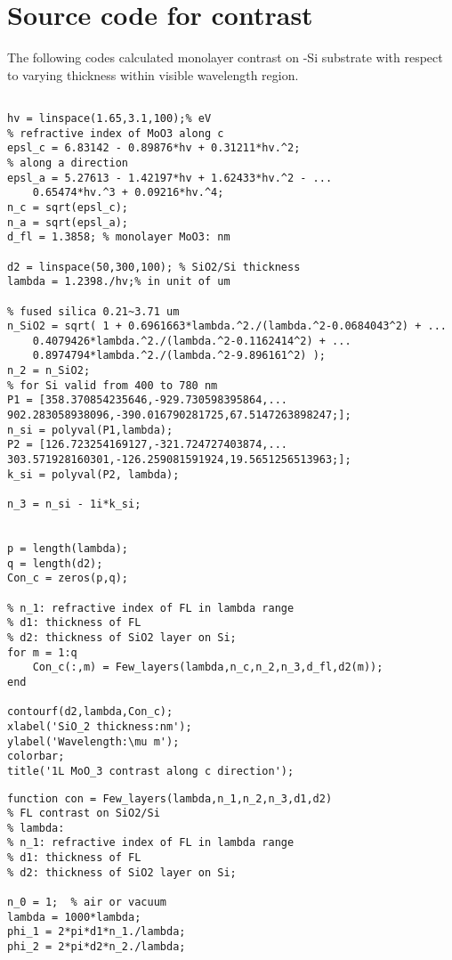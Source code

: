 
\chapter{Source code for contrast}

The following codes calculated monolayer  contrast on -Si substrate with respect to varying  thickness within visible wavelength region. 
\begin{singlespace}
\begin{lstlisting}

hv = linspace(1.65,3.1,100);% eV
% refractive index of MoO3 along c
epsl_c = 6.83142 - 0.89876*hv + 0.31211*hv.^2;
% along a direction
epsl_a = 5.27613 - 1.42197*hv + 1.62433*hv.^2 - ...
    0.65474*hv.^3 + 0.09216*hv.^4;
n_c = sqrt(epsl_c);
n_a = sqrt(epsl_a);
d_fl = 1.3858; % monolayer MoO3: nm

d2 = linspace(50,300,100); % SiO2/Si thickness
lambda = 1.2398./hv;% in unit of um

% fused silica 0.21~3.71 um
n_SiO2 = sqrt( 1 + 0.6961663*lambda.^2./(lambda.^2-0.0684043^2) + ...
    0.4079426*lambda.^2./(lambda.^2-0.1162414^2) + ...
    0.8974794*lambda.^2./(lambda.^2-9.896161^2) );
n_2 = n_SiO2;
% for Si valid from 400 to 780 nm
P1 = [358.370854235646,-929.730598395864,...
902.283058938096,-390.016790281725,67.5147263898247;];
n_si = polyval(P1,lambda);
P2 = [126.723254169127,-321.724727403874,...
303.571928160301,-126.259081591924,19.5651256513963;];
k_si = polyval(P2, lambda);

n_3 = n_si - 1i*k_si;


p = length(lambda);
q = length(d2);
Con_c = zeros(p,q);

% n_1: refractive index of FL in lambda range
% d1: thickness of FL
% d2: thickness of SiO2 layer on Si;
for m = 1:q
    Con_c(:,m) = Few_layers(lambda,n_c,n_2,n_3,d_fl,d2(m));
end

contourf(d2,lambda,Con_c);
xlabel('SiO_2 thickness:nm');
ylabel('Wavelength:\mu m');
colorbar;
title('1L MoO_3 contrast along c direction');
\end{lstlisting}

\begin{lstlisting}
function con = Few_layers(lambda,n_1,n_2,n_3,d1,d2)
% FL contrast on SiO2/Si
% lambda:
% n_1: refractive index of FL in lambda range
% d1: thickness of FL
% d2: thickness of SiO2 layer on Si;

n_0 = 1;  % air or vacuum
lambda = 1000*lambda;
phi_1 = 2*pi*d1*n_1./lambda;
phi_2 = 2*pi*d2*n_2./lambda;


\end{lstlisting}
\end{singlespace}
